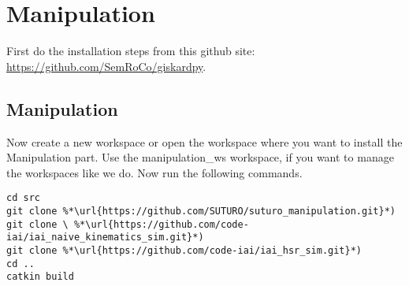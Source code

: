 \documentclass[main.tex]{subfiles}
\begin{document}
\section{Manipulation}
\label{sec:Manipulation}

First do the installation steps from this github site:\\
	\url{https://github.com/SemRoCo/giskardpy}.\\
	
	\subsection{Manipulation}
Now create a new workspace or open the workspace where you want to install the Manipulation part. Use the manipulation\_ws workspace, if you want to manage the workspaces like we do. Now run the following commands.	
\begin{lstlisting}
cd src
git clone %*\url{https://github.com/SUTURO/suturo_manipulation.git}*)
git clone \ %*\url{https://github.com/code-iai/iai_naive_kinematics_sim.git}*)
git clone %*\url{https://github.com/code-iai/iai_hsr_sim.git}*)
cd ..
catkin build  
\end{lstlisting}
	
	
\end{document}

